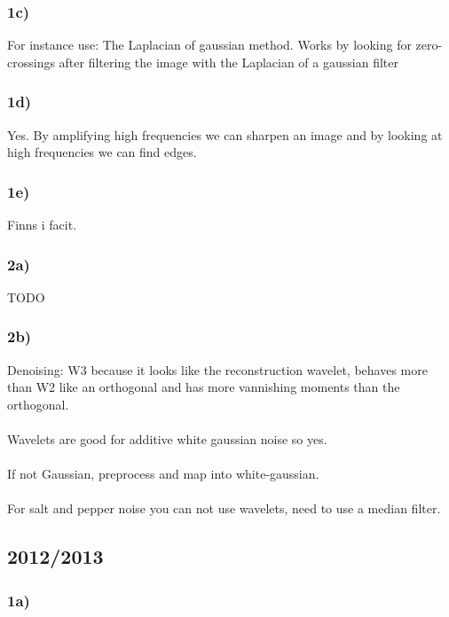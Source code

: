 \documentclass[12pt]{article}
\begin{document}
	\subsubsection*{1c)}
	
	    For instance use: The Laplacian of gaussian method. Works by looking for zero-crossings after filtering the image with the Laplacian of a gaussian filter
	
	\subsubsection*{1d)}
	
	    Yes. By amplifying high frequencies we can sharpen an image and by looking at high frequencies we can find edges.
	
	\subsubsection*{1e)}
	
	    Finns i facit.
	    
	\subsubsection*{2a)}
	
	    TODO
	    
	\subsubsection*{2b)}
	    Denoising: W3 because it looks like the reconstruction wavelet, behaves more than W2 like an orthogonal 
	    and has more vannishing moments than the orthogonal.\\
	    \\
	    Wavelets are good for additive white gaussian noise so yes.\\
	    \\
	    If not Gaussian, preprocess and map into white-gaussian.\\
	    \\
	    For salt and pepper noise you can not use wavelets, need to use a median filter.
	    
\subsection{2012/2013}

    \subsubsection*{1a)}
    
\end{document}
